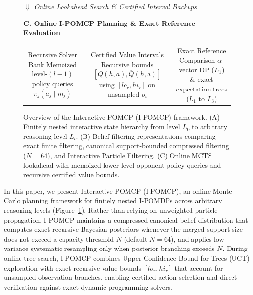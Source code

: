 \begin{figure}[t]
{\begin{minipage}{0.97\textwidth}
      \vspace{6pt}
      {\large $\Downarrow$ \footnotesize\textit{Online Lookahead Search \& Certified Interval Backups}}
      \vspace{4pt}

      {\footnotesize\textbf{\color{warn}C. Online I-POMCP Planning \& Exact Reference Evaluation}}\\[4pt]
      \begin{tabular}{@{}c@{\hspace{6pt}}c@{\hspace{6pt}}c@{}}
        \diagbox{warn!80}{warnbg}{0.22\textwidth}{Recursive Solver Bank\\Memoized level-$(l-1)$\\policy queries $\pi_j(a_j \mid m_j)$} &
        \diagbox{warn!80}{warnbg}{0.28\textwidth}{Certified Value Intervals\\Recursive bounds $[\underline{Q}(h,a), \overline{Q}(h,a)]$\\using $[lo_r, hi_r]$ on unsampled $o_i$} &
        \diagbox{warn!80}{warnbg}{0.23\textwidth}{Exact Reference Comparison\\$\alpha$-vector DP ($L_1$) \& exact\\expectation trees ($L_1$ to $L_3$)}
      \end{tabular}
      \vspace{4pt}
    \end{minipage}%
  }
  \caption{Overview of the Interactive POMCP (I-POMCP) framework. (A) Finitely nested interactive state hierarchy from level $L_0$ to arbitrary reasoning level $L_l$. (B) Belief filtering representations comparing exact finite filtering, canonical support-bounded compressed filtering ($N=64$), and Interactive Particle Filtering. (C) Online MCTS lookahead with memoized lower-level opponent policy queries and recursive certified value bounds.}
  \label{fig:ipomcp_arch}
\end{figure}

In this paper, we present Interactive POMCP (I-POMCP), an online Monte Carlo planning framework for finitely nested I-POMDPs across arbitrary reasoning levels (Figure~\ref{fig:ipomcp_arch}). Rather than relying on unweighted particle propagation, I-POMCP maintains a compressed canonical belief distribution that computes exact recursive Bayesian posteriors whenever the merged support size does not exceed a capacity threshold $N$ (default $N=64$), and applies low-variance systematic resampling only when posterior branching exceeds $N$. During online tree search, I-POMCP combines Upper Confidence Bound for Trees (UCT) exploration \citep{kocsis2006bandit} with exact recursive value bounds $[lo_r, hi_r]$ that account for unsampled observation branches, enabling certified action selection and direct verification against exact dynamic programming solvers.


